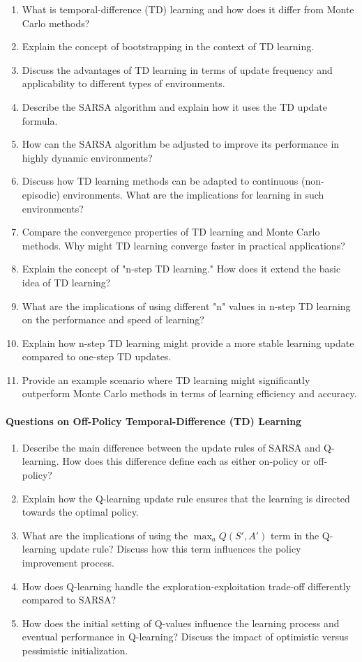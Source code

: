 \begin{enumerate}
\item What is temporal-difference (TD) learning and how does it differ from Monte Carlo methods?
\item Explain the concept of bootstrapping in the context of TD learning.
\item Discuss the advantages of TD learning in terms of update frequency and applicability to different types of environments.
\item Describe the SARSA algorithm and explain how it uses the TD update formula.
\item How can the SARSA algorithm be adjusted to improve its performance in highly dynamic environments?
\item Discuss how TD learning methods can be adapted to continuous (non-episodic) environments. What are the implications for learning in such environments?
\item Compare the convergence properties of TD learning and Monte Carlo methods. Why might TD learning converge faster in practical applications?
\item Explain the concept of "n-step TD learning." How does it extend the basic idea of TD learning?
\item What are the implications of using different "n" values in n-step TD learning on the performance and speed of learning?
\item Explain how n-step TD learning might provide a more stable learning update compared to one-step TD updates.
\item Provide an example scenario where TD learning might significantly outperform Monte Carlo methods in terms of learning efficiency and accuracy.
\end{enumerate}

\paragraph*{Questions on Off-Policy Temporal-Difference (TD) Learning}

\begin{enumerate}
\item Describe the main difference between the update rules of SARSA and Q-learning. How does this difference define each as either on-policy or off-policy?
\item Explain how the Q-learning update rule ensures that the learning is directed towards the optimal policy.
\item What are the implications of using the $\operatorname*{max}_a Q(S', A')$ term in the Q-learning update rule? Discuss how this term influences the policy improvement process.
\item How does Q-learning handle the exploration-exploitation trade-off differently compared to SARSA?
\item How does the initial setting of Q-values influence the learning process and eventual performance in Q-learning? Discuss the impact of optimistic versus pessimistic initialization.
\end{enumerate}

